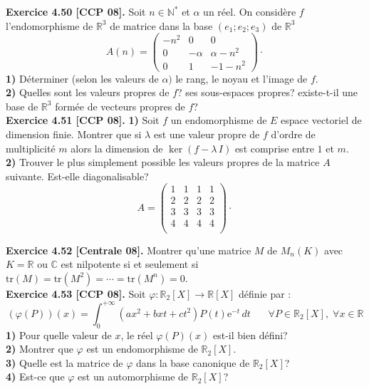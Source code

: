 \documentclass[a4paper,12pt,francais]{article}
\newcommand{\field}[1]{\mathbb{#1}}
\newcommand{\N}{\field{N}}
\newcommand{\R}{\field{R}}
\newcommand{\C}{\field{C}}
\newcommand{\e}{\mbox{e}}
\newcommand{\tr}{\mbox{tr}}
\begin{document}
\noindent
{\bf Exercice 4.50 [CCP 08].} Soit $n\in \N^*$ et $\alpha$ un réel. On considère $f$ l'endomorphisme de $\R^3$ de matrice dans la base $(e_1;e_2;e_3)$ de $\R^3$
$$A(n)=\left({\begin{array}{ccc}
-n^2&0&0\\
0&-\alpha&\alpha-n^2\\
0&1&-1-n^2
\end{array} }\right)\cdot$$
{\bf 1)} Déterminer (selon les valeurs de $\alpha)$ le rang, le noyau et l'image de $f$.\\
{\bf 2)} Quelles sont les valeurs propres de $f$? ses sous-espaces propres? existe-t-il une base de $\R^3$ formée de vecteurs propres de $f$?\\

\noindent
{\bf Exercice 4.51 [CCP 08].} {\bf 1)} Soit $f$ un endomorphisme de $E$ espace vectoriel de dimension finie. Montrer que si $\lambda$ est une valeur propre de $f$ d'ordre de multiplicité $m$ alors la dimension de $\ker(f-\lambda \, I)$ est comprise entre $1$ et $m$.\\
{\bf 2)} Trouver le plus simplement possible les valeurs propres de la matrice $A$ suivante. Est-elle diagonalisable?
$$A=\left( {\begin{array}{cccc}
1&1&1&1\\
2&2&2&2\\
3&3&3&3\\
4&4&4&4\\
\end{array} }\right) \cdot$$
 
\noindent
{\bf Exercice 4.52 [Centrale 08].} Montrer qu'une matrice $M$ de $M_n(K)$ avec $K=\R$ ou $\C$ est nilpotente si et seulement si $\tr(M)=\tr(M^2)=\cdots=\tr(M^n)=0$.\\ 

\noindent
{\bf Exercice 4.53 [CCP 08].} Soit $\varphi : \R_2[X] \to \R[X]$ définie par :
$$
\displaystyle (\varphi(P))(x)=\int_0^{+\infty} (ax^2+bxt+ct^2)P(t)\e^{-t} \, dt \mbox{    } \; \; \; \; \forall P \in \R_2[X], \; \forall x \in \R$$
\indent
{\bf 1)} Pour quelle valeur de $x$, le réel $\varphi(P)(x)$ est-il bien défini?\\
\indent
{\bf 2)} Montrer que $\varphi$ est un endomorphisme de $\R_2[X]$.\\
\indent
{\bf 3)} Quelle est la matrice de $\varphi$ dans la base canonique de $\R_2[X]$?\\
\indent
{\bf 4)} Est-ce que $\varphi$ est un automorphisme de $\R_2[X]$?\\
\end{document}
